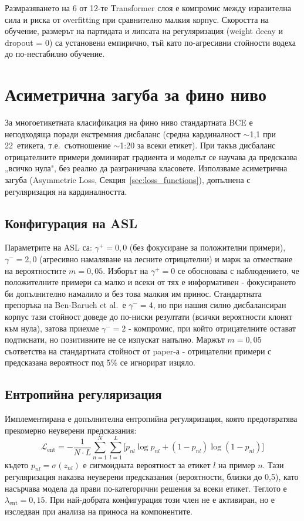 \documentclass[12pt,a4paper]{report}
\begin{document}
Размразяването на 6 от 12-те Transformer слоя е компромис между изразителна сила и риска от overfitting при сравнително малкия корпус. Скоростта на обучение, размерът на партидата и липсата на регуляризация (weight decay и dropout = 0) са установени емпирично, тъй като по-агресивни стойности водеха до по-нестабилно обучение.


\section{Асиметрична загуба за фино ниво}
\label{sec:asl_fine}

За многоетикетната класификация на фино ниво стандартната BCE е неподходяща поради екстремния дисбаланс (средна кардиналност $\sim$1,1 при 22~етикета, т.е.\ съотношение $\sim$1:20 за всеки етикет). При такъв дисбаланс отрицателните примери доминират градиента и моделът се научава да предсказва „всичко нула", без реално да разграничава класовете. Използваме асиметрична загуба (Asymmetric Loss, Секция~\ref{sec:loss_functions}), допълнена с регуляризация на кардиналността.

\subsection{Конфигурация на ASL}

Параметрите на ASL са: $\gamma^+=0{,}0$ (без фокусиране за положителни примери), $\gamma^-=2{,}0$ (агресивно намаляване на лесните отрицателни) и марж за отместване на вероятностите $m=0{,}05$. Изборът на $\gamma^+=0$ се обосновава с наблюдението, че положителните примери са малко и всеки от тях е информативен - фокусирането би допълнително намалило и без това малкия им принос. Стандартната препоръка на Ben-Baruch et al.\ е $\gamma^-=4$, но при нашия силно дисбалансиран корпус тази стойност доведе до по-ниски резултати (всички вероятности клонят към нула), затова приехме $\gamma^-=2$ - компромис, при който отрицателните остават подтиснати, но позитивните не се изпускат напълно. Маржът $m=0{,}05$ съответства на стандартната стойност от paper-а - отрицателни примери с предсказана вероятност под 5\% се игнорират изцяло.

\subsection{Ентропийна регуляризация}

Имплементирана е допълнителна ентропийна регуляризация, която предотвратява прекомерно неуверени предсказания:
\begin{equation}
  \mathcal{L}_{\text{ent}} = -\frac{1}{N \cdot L} \sum_{n=1}^{N} \sum_{l=1}^{L} \bigl[ p_{nl} \log p_{nl} + (1 - p_{nl}) \log(1 - p_{nl}) \bigr]
  \label{eq:entropy_reg}
\end{equation}
където $p_{nl} = \sigma(z_{nl})$ е сигмоидната вероятност за етикет $l$ на пример $n$. Тази регуляризация наказва неуверени предсказания (вероятности, близки до 0{,}5), като насърчава модела да прави по-категорични решения за всеки етикет. Теглото е $\lambda_{\text{ent}} = 0{,}15$. При най-добрата конфигурация този член не е активиран, но е изследван при анализа на приноса на компонентите.
\end{document}
